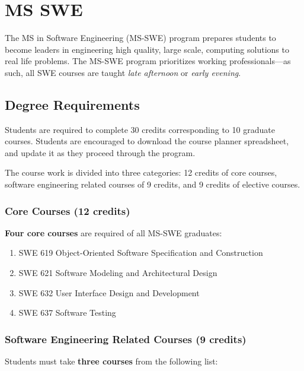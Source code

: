 \documentclass[oneside,11pt]{memoir}
\begin{document}
\chapter{MS SWE}

The MS in Software Engineering (MS-SWE) program prepares students to become leaders in engineering high quality, large scale, computing solutions to real life problems. The MS-SWE program prioritizes working professionals—as such, all SWE courses are taught \emph{late afternoon} or \emph{early evening}.

\section{Degree Requirements}

Students are required to complete 30 credits corresponding to 10 graduate courses. Students are encouraged to download the course planner spreadsheet, and update it as they proceed through the program.

The course work is divided into three categories: 12 credits of core courses, software engineering related courses of 9 credits, and 9 credits of elective courses.

\subsection{Core Courses (12 credits)}

\textbf{Four core courses} are required of all MS-SWE graduates:

\begin{enumerate}
    \item SWE 619 Object-Oriented Software Specification and Construction
    \item SWE 621 Software Modeling and Architectural Design
    \item SWE 632 User Interface Design and Development
    \item SWE 637 Software Testing
\end{enumerate}

\subsection{Software Engineering Related Courses (9 credits)}

Students must take \textbf{three courses} from the following list:
\end{document}
